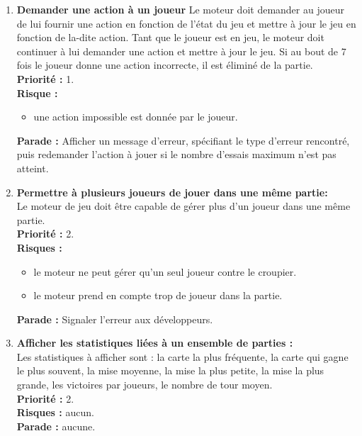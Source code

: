 \begin{enumerate}
    \item \textbf{Demander une action à un joueur}
    Le moteur doit demander au joueur de lui fournir une action en fonction de l'état du jeu et mettre à jour le jeu en fonction de la-dite action. Tant que le joueur est en jeu, le moteur doit continuer à lui demander une action et mettre à jour le jeu. Si au bout de 7 fois le joueur donne une action incorrecte, il est éliminé de la partie.\\ 
    \textbf{Priorité :} 1. \\
    \textbf{Risque :} 
    \begin{itemize}
        \item une action impossible est donnée par le joueur.
    \end{itemize}
    \textbf{Parade :} Afficher un message d'erreur, spécifiant le type d'erreur rencontré, puis redemander l'action à jouer si le nombre d'essais maximum n'est pas atteint.
    
    \item \textbf{Permettre à plusieurs joueurs de jouer dans une même partie:} \\
    Le moteur de jeu doit être capable de gérer plus d'un joueur dans une même partie.\\
    \textbf{Priorité :} 2.\\
    \textbf{Risques :} 
    \begin{itemize}
        \item le moteur ne peut gérer qu'un seul joueur contre le croupier.
        \item le moteur prend en compte trop de joueur dans la partie.
    \end{itemize}
    \textbf{Parade :} Signaler l'erreur aux développeurs.
    
    \item \textbf{Afficher les statistiques liées à un ensemble de parties :}
    \label{itm:stats}
    \\
    Les statistiques à afficher sont : la carte la plus fréquente, la carte qui gagne le plus souvent, la mise moyenne, la mise la plus petite, la mise la plus grande, les victoires par joueurs, le nombre de tour moyen. \\
    \textbf{Priorité :} 2. \\
    \textbf{Risques :} aucun. \\
    \textbf{Parade :} aucune.
    
\end{enumerate}

